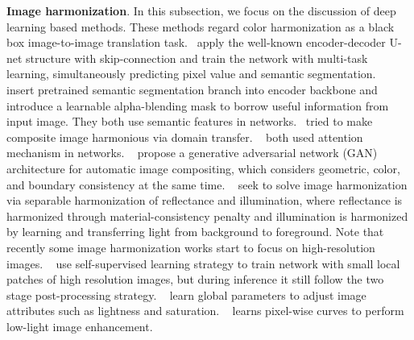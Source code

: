 \documentclass[runningheads]{llncs}
\begin{document}
    \textbf{Image harmonization}.
In this subsection, we focus on the discussion of deep learning based methods.
    These methods regard color harmonization as a black box image-to-image translation task.~\cite{tsai2017deep} apply the well-known encoder-decoder  U-net structure with skip-connection and train the network with multi-task learning, simultaneously predicting pixel value and semantic segmentation.
     ~\cite{sofiiuk2021foreground} insert pretrained semantic segmentation branch into encoder backbone and introduce a learnable alpha-blending mask to borrow useful information from input image. They both use semantic features in networks.~\cite{cong2020dovenet, cong2021bargainnet} tried to make composite image harmonious via domain transfer.
    ~\cite{cun2020improving, hao2020image} both used attention mechanism in networks.
    ~\cite{chen2019toward} propose a generative adversarial network (GAN) architecture for automatic image compositing, which considers geometric, color, and boundary consistency at the same time.
    ~\cite{guo2021intrinsic} seek to solve image harmonization via separable harmonization of reflectance and illumination, where reflectance is harmonized through material-consistency penalty and illumination is harmonized by learning and transferring light from background to foreground.
    Note that recently some image harmonization works start to focus on high-resolution images.
    ~\cite{jiang2021ssh} use self-supervised learning strategy to train network with small local patches of high resolution images, but during inference it still follow the two stage post-processing strategy.
    ~\cite{hu2018exposure,shi2021learning} learn global parameters to adjust image attributes such as lightness and saturation. 
    ~\cite{Zero-DCE} learns pixel-wise curves to perform low-light image enhancement.
    
\end{document}
